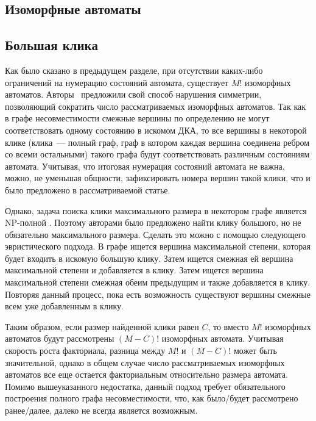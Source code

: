 \subsection{Изоморфные автоматы}
\label{sec:review:sym-breaking:isomorphic-automata}


\subsection{Большая клика}
\label{sec:review:sym-breaking:large-clique}

Как было сказано в предыдущем разделе, при отсутствии каких-либо ограничений на нумерацию состояний автомата, существует $M!$ изоморфных автоматов.
Авторы~\cite{heule-icgi10} предложили свой способ нарушения симметрии, позволяющий сократить число рассматриваемых изоморфных автоматов.
Так как в графе несовместимости смежные вершины по определению не могут соответствовать одному состоянию в искомом ДКА, то все вершины в некоторой клике (клика~{---} полный граф, граф в котором каждая вершина соединена ребром со всеми остальными)  такого графа будут соответствовать различным состояниям автомата.
Учитывая, что итоговая нумерация состояний автомата не важна, можно, не уменьшая общности, зафиксировать номера вершин такой клики, что и было предложено в рассматриваемой статье.

Однако, задача поиска клики максимального размера в некотором графе является NP-полной .
Поэтому авторами было предложено найти клику большого, но не обязательно максимального размера.
Сделать это можно с помощью следующего эвристического подхода.
В графе ищется вершина максимальной степени, которая будет входить в искомую большую клику.
Затем ищется смежная ей вершина максимальной степени и добавляется в клику.
Затем ищется вершина максимальной степени смежная обеим предыдущим и также добавляется в клику. 
Повторяя данный процесс, пока есть возможность существуют вершины смежные всем уже добавленным в клику.

Таким образом, если размер найденной клики равен $C$, то вместо $M!$ изоморфных автоматов будут рассмотрены $(M - C)!$ изоморфных автомата.
Учитывая скорость роста факториала, разница между $M!$ и $(M - C)!$ может быть значительной, однако в общем случае число рассматриваемых изоморфных автоматов все еще остается факториальным относительно размера автомата.
Помимо вышеуказанного недостатка, данный подход требует обязательного построения полного графа несовместимости, что, как было/будет  рассмотрено ранее/далее, далеко не всегда является возможным.

